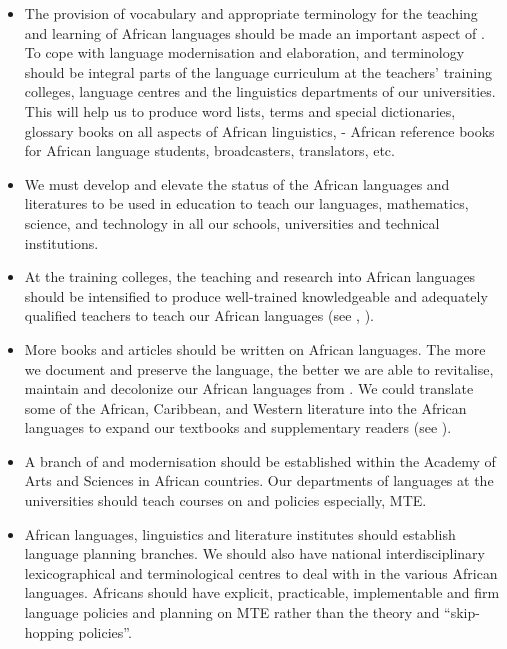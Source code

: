 \documentclass[output=paper,
modfonts
]{langscibook}
\begin{document}
\begin{itemize}
\item 
The provision of vocabulary and appropriate terminology for the teaching and learning of African languages should be made an important aspect of . To cope with language modernisation and elaboration,  and terminology should be integral parts of the language curriculum at the teachers’ training colleges, language centres and the linguistics departments of our universities. This will help us to produce word lists, terms and special dictionaries, glossary books on all aspects of African linguistics, - African reference books for African language students, broadcasters, translators, etc. 

\item 
We must develop and elevate the status of the African languages and literatures to be used in education to teach our languages, mathematics, science, and technology in all our schools, universities and technical institutions. 

\item 
At the training colleges, the teaching and research into African languages should be intensified to produce well-trained knowledgeable and adequately qualified teachers to teach our African languages (see \citealt[9]{Prah1993}, \citealt[305]{Adegbija2001}). 

\item 
More books and articles should be written on African languages. The more we document and preserve the language, the better we are able to revitalise, maintain and decolonize our African languages from . We could translate some of the African, Caribbean, and Western literature into the African languages to expand our textbooks and supplementary readers (see \citealt{Agyekum2003}). 

\item 
A branch of  and modernisation should be established within the Academy of Arts and Sciences in African countries. Our departments of languages at the universities should teach courses on  and policies especially, MTE. 

\item 
African languages, linguistics and literature institutes should establish language planning branches. We should also have national interdisciplinary lexicographical and terminological centres to deal with  in the various African languages. Africans should have explicit, practicable, implementable and firm language policies and planning on MTE rather than the theory and “skip-hopping policies”.


\end{itemize}
\end{document}
